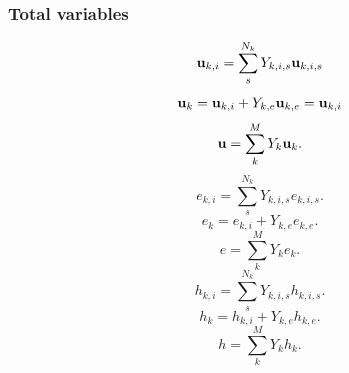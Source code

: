 \documentclass[a4paper,11pt]{report}
\begin{document}
\subsubsection{Total variables}
\begin{equation}
    \label{eq:sf_vars_u_ki}
    \mathbf{u}_{k,i} = \sum_s^{N_k} Y_{k,i,s} \mathbf{u}_{k,i,s} 
\end{equation}
\begin{equation}
    \label{eq:sf_vars_u_k}
    \mathbf{u}_k = \mathbf{u}_{k,i} + Y_{k,e} \mathbf{u}_{k,e} = \mathbf{u}_{k,i}
\end{equation}
\begin{equation}
    \label{eq:sf_vars_u}
    \mathbf{u} = \sum_k^M Y_k \mathbf{u}_k.
\end{equation}
\begin{equation}
    \label{eq:sf_vars_e_ki}
    e_{k,i} = \sum_s^{N_k} Y_{k,i,s} e_{k,i,s}.
\end{equation}
\begin{equation}
    \label{eq:sf_vars_e_k}
    e_k = e_{k,i} + Y_{k,e} e_{k,e}.
\end{equation}
\begin{equation}
    \label{eq:sf_vars_e}
    e = \sum_k^M Y_k e_k.
\end{equation}
\begin{equation}
    h_{k,i} = \sum_s^{N_k} Y_{k,i,s} h_{k,i,s}.
\end{equation}
\begin{equation}
    h_k = h_{k,i} + Y_{k,e} h_{k,e}.
\end{equation}
\begin{equation}
    h = \sum_k^M Y_k h_k.
\end{equation}

\end{document}
